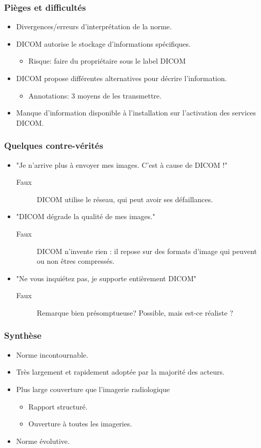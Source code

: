\frame
{
	\frametitle{Pi\`eges et difficult\'es}
	\begin{itemize}
		\item Divergences/erreurs d'interpr\'etation de la norme.
		\item DICOM autorise le stockage d'informations sp\'ecifiques.
		\begin{itemize}
			\item Risque: faire du propri\'etaire sous le label DICOM
		\end{itemize}
		\item DICOM propose diff\'erentes alternatives pour d\'ecrire l'information.
		\begin{itemize}
			\item Annotations: 3 moyens de les transmettre.
		\end{itemize}
		\item Manque d'information disponible \`a l'installation sur l'activation des services DICOM.
	\end{itemize}
}

\frame
{
	\frametitle{Quelques contre-v\'erit\'es}
	\begin{itemize}
		\item "Je n'arrive plus \`a envoyer mes images. C'est \`a cause de DICOM !"
		\begin{description}
			\item[Faux] DICOM utilise le r\'eseau, qui peut avoir ses d\'efaillances.
		\end{description}
		\item "DICOM d\'egrade la qualit\'e de mes images."
		\begin{description}
			\item[Faux] DICOM n'invente rien : il repose sur des formats d'image qui peuvent ou non \^etres compress\'es.
		\end{description}
		\item "Ne vous inqui\'etez pas, je supporte enti\`erement DICOM"
		\begin{description}
			\item[Faux] Remarque bien pr\'esomptueuse?
			Possible, mais est-ce r\'ealiste ?
		\end{description}
	\end{itemize}
}

\frame
{
	\frametitle{Synth\`ese}
	\begin{itemize}
		\item Norme incontournable.
		\item Tr\`es largement et rapidement adopt\'ee par la majorit\'e des acteurs.
		\item Plus large couverture que l'imagerie radiologique
		\begin{itemize}
			\item Rapport structur\'e.
			\item Ouverture \`a toutes les imageries.
		\end{itemize}
		\item Norme \'evolutive.
	\end{itemize}
}
